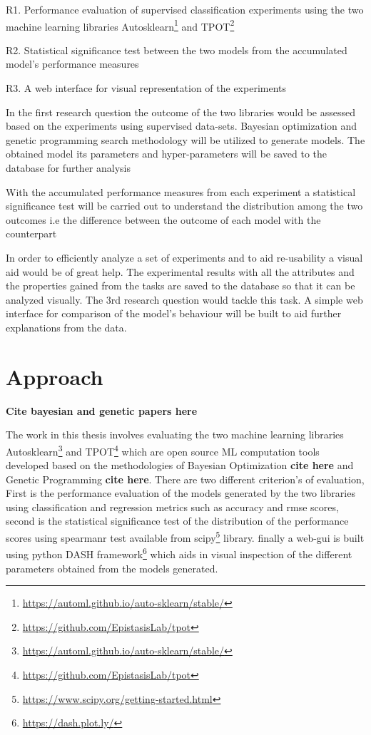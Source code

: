 R1.\label{point:R1} Performance evaluation of supervised classification experiments using the two machine learning libraries Autosklearn\footnote{\url{https://automl.github.io/auto-sklearn/stable/}} and TPOT\footnote{\url{https://github.com/EpistasisLab/tpot}}

R2.\label{point:R2} Statistical significance test between the two models from the accumulated model's performance measures

R3.\label{point:R3} A web interface for visual representation of the experiments

In the first research question the outcome of the two libraries would be assessed based on the experiments using supervised data-sets. Bayesian optimization and genetic programming search methodology will be utilized to generate models. The obtained model its parameters and hyper-parameters will be saved to the database for further analysis

With the accumulated performance measures from each experiment a statistical significance test will be carried out to understand the distribution among the two outcomes i.e the difference between the outcome of each model with the counterpart

In order to efficiently analyze a set of experiments and to aid re-usability a visual aid would be of great help. The experimental results with all the attributes and the properties gained from the tasks are saved to the database so that it can be analyzed visually. The 3rd research question would tackle this task. A simple web interface for comparison of the model's behaviour will be built to aid further explanations from the data.

\section{Approach}
\textbf{Cite bayesian and genetic papers here}


The work in this thesis involves evaluating the two machine learning libraries Autosklearn\footnote{\url{https://automl.github.io/auto-sklearn/stable/}} and TPOT\footnote{\url{https://github.com/EpistasisLab/tpot}} which are open source ML computation tools developed based on the methodologies of Bayesian Optimization \textbf{cite here} and Genetic Programming \textbf{cite here}. There are two different criterion's of evaluation, First is the performance evaluation of the models generated by the two libraries using classification and regression metrics such as accuracy and rmse scores, second is the statistical significance test of the distribution of the performance scores using spearmanr test available from scipy\footnote{\url{https://www.scipy.org/getting-started.html}} library. finally a web-gui is built using python DASH framework\footnote{\url{https://dash.plot.ly/}} which aids in visual inspection of the different parameters obtained from the models generated.

